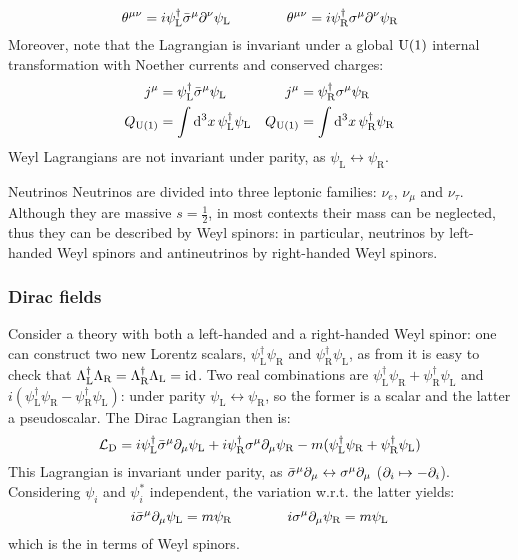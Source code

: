\begin{equation}
  \theta^{\mu \nu} = i \psi_\text{L}^\dagger \bar{\sigma}^\mu \partial^\nu \psi_\text{L}
  \qquad \qquad
  \theta^{\mu \nu} = i \psi_\text{R}^\dagger \sigma^\mu \partial^\nu \psi_\text{R}
\end{equation}
Moreover, note that the Lagrangian is invariant under a global $ \mathrm{U}(1) $ internal transformation with Noether currents and conserved charges:
\begin{align*}
  j^\mu &= \psi_\text{L}^\dagger \bar{\sigma}^\mu \psi_\text{L} & j^\mu &= \psi_\text{R}^\dagger \sigma^\mu \psi_\text{R} \\
  Q_{\mathrm{U}(1)} &= \int \mathrm{d}^3x\, \psi_\text{L}^\dagger \psi_\text{L} & Q_{\mathrm{U}(1)} &= \int \mathrm{d}^3x\, \psi_\text{R}^\dagger \psi_\text{R}
\end{align*}
Weyl Lagrangians are not invariant under parity, as $ \psi_\text{L} \leftrightarrow \psi_\text{R} $.

\begin{example}{Neutrinos}{}
  Neutrinos are divided into three leptonic families: $ \nu_e $, $ \nu_\mu $ and $ \nu_\tau $. Although they are massive $ s = \frac{1}{2} $, in most contexts their mass can be neglected, thus they can be described by Weyl spinors: in particular, neutrinos by left-handed Weyl spinors and antineutrinos by right-handed Weyl spinors.
\end{example}

\subsubsection{Dirac fields}

Consider a theory with both a left-handed and a right-handed Weyl spinor: one can construct two new Lorentz scalars, $ \psi_\text{L}^\dagger \psi_\text{R} $ and $ \psi_\text{R}^\dagger \psi_\text{L} $, as from  it is easy to check that $ \Lambda_\text{L}^\dagger \Lambda_\text{R} = \Lambda_\text{R}^\dagger \Lambda_\text{L} = \operatorname{id} $. Two real combinations are $ \psi_\text{L}^\dagger \psi_\text{R} + \psi_\text{R}^\dagger \psi_\text{L} $ and $ i (\psi_\text{L}^\dagger \psi_\text{R} - \psi_\text{R}^\dagger \psi_\text{L}) $: under parity $ \psi_\text{L} \leftrightarrow \psi_\text{R} $, so the former is a scalar and the latter a pseudoscalar. The Dirac Lagrangian then is:
\begin{equation}
  \mathcal{L}_\text{D} = i \psi_\text{L}^\dagger \bar{\sigma}^\mu \partial_\mu \psi_\text{L} + i \psi_\text{R}^\dagger \sigma^\mu \partial_\mu \psi_\text{R} - m ( \psi_\text{L}^\dagger \psi_\text{R} + \psi_\text{R}^\dagger \psi_\text{L} )
\end{equation}
This Lagrangian is invariant under parity, as $ \bar{\sigma}^\mu \partial_\mu \leftrightarrow \sigma^\mu \partial_\mu $ ($ \partial_i \mapsto - \partial_i $). Considering $ \psi_i $ and $ \psi_i^* $ independent, the variation w.r.t. the latter yields:
\begin{equation}
  i \bar{\sigma}^\mu \partial_\mu \psi_\text{L} = m \psi_\text{R}
  \qquad \qquad
  i \sigma^\mu \partial_\mu \psi_\text{R} = m \psi_\text{L}
\end{equation}
which is the  in terms of Weyl spinors.


